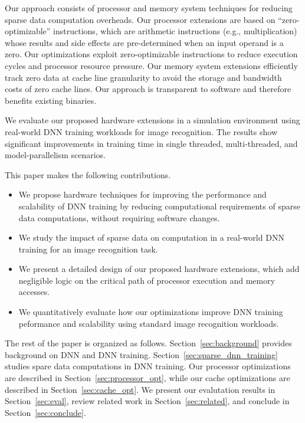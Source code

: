 Our approach consists of processor and memory system techniques for reducing sparse data computation overheads.  Our processor extensions are based on ``zero-optimizable'' instructions, which are arithmetic instructions (e.g., multiplication) whose results and side effects are pre-determined when an input operand is a zero. Our optimizations exploit zero-optimizable instructions to reduce execution cycles and processor resource pressure.  Our memory system extensions efficiently track zero data at cache line granularity to avoid the storage and bandwidth costs of zero cache lines.  Our approach is transparent to software and therefore benefits existing binaries. 

We evaluate our proposed hardware extensions in a simulation environment using real-world DNN training workloads for image recognition. The results show significant improvements in training time in single threaded, multi-threaded, and model-parallelism scenarios.

This paper makes the following contributions.
\begin{itemize}

\item We propose hardware techniques for improving the performance and scalability of DNN training by reducing computational requirements of sparse data computations, without requiring software changes. 
\item We study the impact of sparse data on computation in a real-world DNN training for an image recognition task. 
\item We present a detailed design of our proposed hardware extensions, which add negligible logic on the critical path of processor execution and memory accesses. 
\item We quantitatively evaluate how our optimizations improve DNN training peformance and scalability using standard image recognition workloads. 

\end{itemize}

The rest of the paper is organized as follows.  Section~\ref{sec:background} provides background on DNN and DNN training.  Section~\ref{sec:sparse_dnn_training} studies spare data computations in DNN training.  Our processor optimizations are described in Section~\ref{sec:processor_opt}, while our cache optimizations are described in Section~\ref{sec:cache_opt}.  We present our evalutation results in Section~\ref{sec:eval}, review related work in Section~\ref{sec:related},  and conclude in Section~\ref{sec:conclude}.


